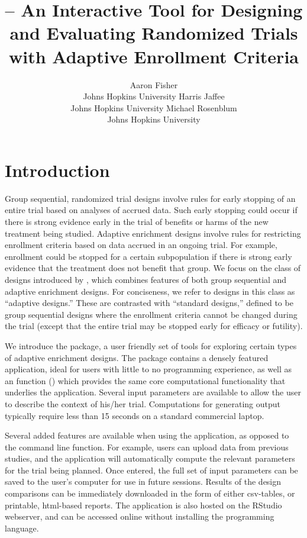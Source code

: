 \documentclass[article]{jss}
\title{\pkg{interAdapt} – An Interactive Tool for Designing and Evaluating Randomized Trials with Adaptive Enrollment Criteria}
\date{}
\author{Aaron Fisher \\Johns Hopkins University \And Harris Jaffee \\Johns Hopkins University \And Michael Rosenblum\\Johns Hopkins University}
\begin{document}
\maketitle








\section*{Introduction} \label{sec:intro}
Group sequential, randomized trial designs involve rules for early stopping of an entire trial based on analyses of accrued data. Such early stopping could occur if there is strong evidence early in the trial of benefits or harms of the new treatment being studied. Adaptive enrichment designs involve rules for restricting enrollment criteria based on data accrued in an ongoing trial. For example, enrollment could be stopped for a certain subpopulation if there is strong early evidence that the treatment does not benefit that group.
We focus on the  class of designs introduced by \cite{Rosenblum2013AdaptMISTIE}, which combines features of both group sequential and adaptive enrichment designs. For conciseness, we refer to designs in this class as  ``adaptive designs.''
These are contrasted with ``standard designs,'' 
defined to  be group sequential designs where the enrollment criteria cannot be changed during the trial (except that the entire trial may be stopped early for efficacy or futility). 

We introduce the   package, a user friendly set of tools for exploring certain types of adaptive enrichment designs. The package contains a densely featured  application, ideal for users with little to no  programming experience, as well as an  function () which provides the same core computational functionality that underlies the  application. Several input parameters are available to allow the user to describe the context of his/her trial. Computations for generating output typically require less than 15 seconds on a standard commercial laptop. 

Several added features are available when using the  application, as opposed to the command line function. For example, users can upload data from previous studies, and the application will automatically compute the relevant parameters for the trial being planned. Once entered, the full set of input parameters can be saved to the user's computer for use in future sessions. Results of the design comparisons can be immediately downloaded in the form of either csv-tables, or printable, html-based reports. The  application is also hosted on the RStudio webserver, and can be accessed online without installing the  programming language.
\end{document}

